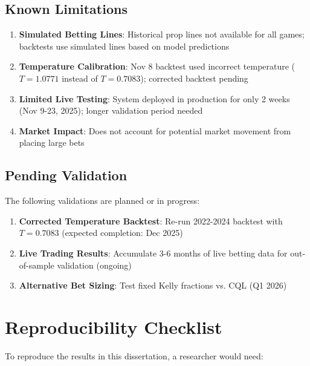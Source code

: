 \subsection{Known Limitations}

\begin{enumerate}
    \item \textbf{Simulated Betting Lines}: Historical prop lines not available for all games; backtests use simulated lines based on model predictions
    \item \textbf{Temperature Calibration}: Nov 8 backtest used incorrect temperature ($T=1.0771$ instead of $T=0.7083$); corrected backtest pending
    \item \textbf{Limited Live Testing}: System deployed in production for only 2 weeks (Nov 9-23, 2025); longer validation period needed
    \item \textbf{Market Impact}: Does not account for potential market movement from placing large bets
\end{enumerate}

\subsection{Pending Validation}

The following validations are planned or in progress:

\begin{enumerate}
    \item \textbf{Corrected Temperature Backtest}: Re-run 2022-2024 backtest with $T=0.7083$ (expected completion: Dec 2025)
    \item \textbf{Live Trading Results}: Accumulate 3-6 months of live betting data for out-of-sample validation (ongoing)
    \item \textbf{Alternative Bet Sizing}: Test fixed Kelly fractions vs. CQL (Q1 2026)
\end{enumerate}

\section{Reproducibility Checklist}

To reproduce the results in this dissertation, a researcher would need:


